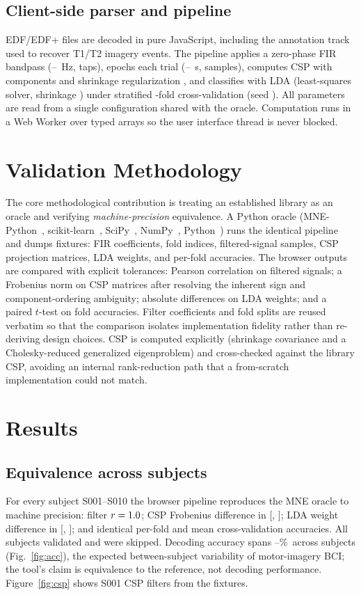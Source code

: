 \documentclass[journal]{IEEEtran}
\begin{document}
\subsection{Client-side parser and pipeline}
EDF/EDF+ files are decoded in pure JavaScript, including the annotation track used to recover
T1/T2 imagery events. The pipeline applies a zero-phase FIR bandpass (\FirLo--\FirHi~Hz,
\FirTaps{} taps), epochs each trial (\Tmin--\Tmax~s, \Ntimes{} samples), computes CSP with
\CspComp{} components and shrinkage regularization \CspReg{}, and classifies with LDA (least-squares
solver, shrinkage \LdaShrink{}) under stratified \Folds-fold cross-validation (seed \Seed{}). All
parameters are read from a single configuration shared with the oracle. Computation runs in a Web
Worker over typed arrays so the user interface thread is never blocked.

\section{Validation Methodology}
The core methodological contribution is treating an established library as an oracle and verifying
\emph{machine-precision} equivalence. A Python oracle (MNE-Python~\MneVer{},
scikit-learn~\SklearnVer{}, SciPy~\ScipyVer{}, NumPy~\NumpyVer{}, Python~\PyVer{}) runs the identical
pipeline and dumps fixtures: FIR coefficients, fold indices, filtered-signal samples, CSP projection
matrices, LDA weights, and per-fold accuracies. The browser outputs are compared with explicit
tolerances: Pearson correlation on filtered signals; a Frobenius norm on CSP matrices after
resolving the inherent sign and component-ordering ambiguity; absolute differences on LDA weights;
and a paired $t$-test on fold accuracies. Filter coefficients and fold splits are reused verbatim so
that the comparison isolates implementation fidelity rather than re-deriving design choices.
CSP is computed explicitly (shrinkage covariance and a Cholesky-reduced generalized eigenproblem)
and cross-checked against the library CSP, avoiding an internal rank-reduction path that a
from-scratch implementation could not match.

\section{Results}
\subsection{Equivalence across subjects}
For every subject S001--S010 the browser pipeline reproduces the MNE oracle to machine precision:
filter $r=1.0$; CSP Frobenius difference in [\CspFrobMin{}, \CspFrobMax{}]; LDA weight
difference in [\LdaDiffMin{}, \LdaDiffMax{}]; and identical per-fold and mean cross-validation
accuracies. All \Nsubjects{} subjects validated and \Nskipped{} were skipped. Decoding accuracy
spans \AccMin--\AccMax\%\ across subjects (Fig.~\ref{fig:acc}), the expected between-subject
variability of motor-imagery BCI; the tool's claim is equivalence to the reference, not decoding
performance. Figure~\ref{fig:csp} shows S001 CSP filters from the fixtures.
\end{document}
